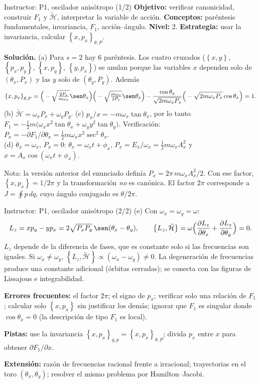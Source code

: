 \documentclass[spanish]{beamer}
\newcommand{\tH}{\tilde{\mathcal{H}}}        %
\newcommand{\pd}[2]{\frac{\partial #1}{\partial #2}}
\newcommand{\pb}[2]{\left\{#1,#2\right\}}    %
\begin{document}
\begin{frame}{Instructor: P1, oscilador anisótropo (1/2)}
\scriptsize
\textbf{Objetivo:} verificar canonicidad, construir $F_1$ y $\tH$, interpretar la variable
de acción. \textbf{Conceptos:} paréntesis fundamentales, invariancia, $F_1$, acción--ángulo.
\textbf{Nivel:} 2. \textbf{Estrategia:} usar la invariancia, calcular $\pb{x}{p_x}_{\theta,P}$.

\medskip
\textbf{Solución.}
(a) Para $s=2$ hay 6 paréntesis. Los cuatro cruzados ($\pb{x}{y}$, $\pb{p_x}{p_y}$,
$\pb{x}{p_y}$, $\pb{y}{p_x}$) se anulan porque las variables $x$ dependen solo de
$(\theta_x,P_x)$ y las $y$ solo de $(\theta_y,P_y)$. Además
\[
  \pb{x}{p_x}_{\theta,P}
  =\Big(-\sqrt{\tfrac{2P_x}{m\omega_x}}\sen\theta_x\Big)\Big(-\sqrt{\tfrac{m\omega_x}{2P_x}}\sen\theta_x\Big)
  -\frac{\cos\theta_x}{\sqrt{2m\omega_xP_x}}\Big(-\sqrt{2m\omega_xP_x}\cos\theta_x\Big)=1 .
\]
(b) $\tH=\omega_xP_x+\omega_yP_y$.
(c) $p_x/x=-m\omega_x\tan\theta_x$, por lo tanto
$F_1=-\tfrac12 m\big(\omega_xx^2\tan\theta_x+\omega_yy^2\tan\theta_y\big)$.
Verificación: $P_x=-\partial F_1/\partial\theta_x=\tfrac12 m\omega_xx^2\sec^2\theta_x$. \checkmark
\\(d) $\dot\theta_x=\omega_x$, $\dot P_x=0$: $\theta_x=\omega_xt+\phi_x$,
$P_x=E_x/\omega_x=\tfrac12 m\omega_xA_x^2$ y $x=A_x\cos(\omega_xt+\phi_x)$.

\medskip
\alert{Nota:} la versión anterior del enunciado definía $P_x=2\pi\,m\omega_xA_x^2/2$.
Con ese factor, $\pb{x}{p_x}=1/2\pi$ y la transformación \emph{no} es canónica. El factor
$2\pi$ corresponde a $J=\oint p\,dq$, cuyo ángulo conjugado es $\theta/2\pi$.
\end{frame}

\begin{frame}{Instructor: P1, oscilador anisótropo (2/2)}
\scriptsize
(e) Con $\omega_x=\omega_y=\omega$:
\[
  L_z=xp_y-yp_x=2\sqrt{P_xP_y}\,\sen(\theta_x-\theta_y),\qquad
  \pb{L_z}{\tH}=\omega\Big(\pd{L_z}{\theta_x}+\pd{L_z}{\theta_y}\Big)=0 .
\]
$L_z$ depende de la diferencia de fases, que es constante solo si las frecuencias son
iguales. Si $\omega_x\neq\omega_y$, $\pb{L_z}{\tH}\propto(\omega_x-\omega_y)\neq0$.
La degeneración de frecuencias produce una constante adicional (órbitas cerradas);
se conecta con las figuras de Lissajous e integrabilidad.

\medskip
\textbf{Errores frecuentes:} el factor $2\pi$; el signo de $p_x$; verificar solo una
relación de $F_1$; calcular solo $\pb{x}{p_x}$ sin justificar los demás; ignorar que
$F_1$ es singular donde $\cos\theta_x=0$ (la descripción de tipo $F_1$ es local).

\textbf{Pistas:} use la invariancia $\pb{x}{p_x}_{q,p}=\pb{x}{p_x}_{\theta,P}$;
divida $p_x$ entre $x$ para obtener $\partial F_1/\partial x$.

\textbf{Extensión:} razón de frecuencias racional frente a irracional; trayectorias en
el toro $(\theta_x,\theta_y)$; resolver el mismo problema por Hamilton--Jacobi.
\end{frame}
\end{document}
